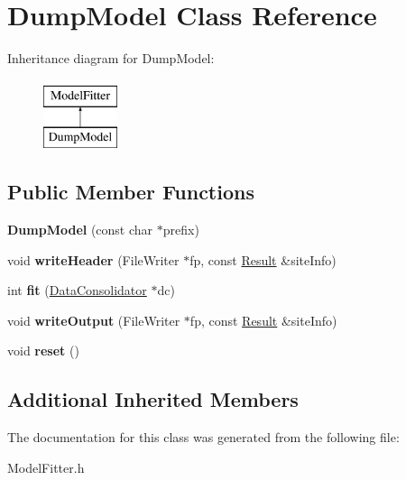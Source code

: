 \hypertarget{classDumpModel}{\section{Dump\-Model Class Reference}
\label{classDumpModel}
}
Inheritance diagram for Dump\-Model\-:\begin{figure}[H]
\begin{center}
\leavevmode
\includegraphics[height=2.000000cm]{classDumpModel}
\end{center}
\end{figure}
\subsection*{Public Member Functions}
\begin{DoxyCompactItemize}
\item 
\hypertarget{classDumpModel_adc586e8f306f77d6a7b461b034f1c26d}{{\bfseries Dump\-Model} (const char $\ast$prefix)}\label{classDumpModel_adc586e8f306f77d6a7b461b034f1c26d}

\item 
\hypertarget{classDumpModel_abdb9111db3a72c3ea52f99a7fd3cdaa3}{void {\bfseries write\-Header} (File\-Writer $\ast$fp, const \hyperlink{classResult}{Result} \&site\-Info)}\label{classDumpModel_abdb9111db3a72c3ea52f99a7fd3cdaa3}

\item 
\hypertarget{classDumpModel_a97c88e2942815e95bdb924f88c6083a4}{int {\bfseries fit} (\hyperlink{classDataConsolidator}{Data\-Consolidator} $\ast$dc)}\label{classDumpModel_a97c88e2942815e95bdb924f88c6083a4}

\item 
\hypertarget{classDumpModel_a3d0a2e4ff56b28e167d5c2d554640917}{void {\bfseries write\-Output} (File\-Writer $\ast$fp, const \hyperlink{classResult}{Result} \&site\-Info)}\label{classDumpModel_a3d0a2e4ff56b28e167d5c2d554640917}

\item 
\hypertarget{classDumpModel_adad74c4ddd06bb4d246bb9695b625ce7}{void {\bfseries reset} ()}\label{classDumpModel_adad74c4ddd06bb4d246bb9695b625ce7}

\end{DoxyCompactItemize}
\subsection*{Additional Inherited Members}


The documentation for this class was generated from the following file\-:\begin{DoxyCompactItemize}
\item 
Model\-Fitter.\-h\end{DoxyCompactItemize}
